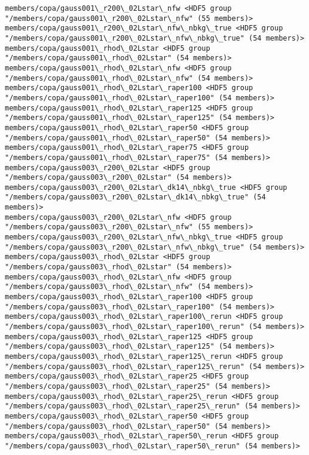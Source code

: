 \documentclass[11pt]{article}
\begin{document}
\begin{Verbatim}[commandchars=\\\{\}]
members/copa/gauss001\_r200\_02Lstar\_nfw <HDF5 group "/members/copa/gauss001\_r200\_02Lstar\_nfw" (55 members)>
members/copa/gauss001\_r200\_02Lstar\_nfw\_nbkg\_true <HDF5 group "/members/copa/gauss001\_r200\_02Lstar\_nfw\_nbkg\_true" (54 members)>
members/copa/gauss001\_rhod\_02Lstar <HDF5 group "/members/copa/gauss001\_rhod\_02Lstar" (54 members)>
members/copa/gauss001\_rhod\_02Lstar\_nfw <HDF5 group "/members/copa/gauss001\_rhod\_02Lstar\_nfw" (54 members)>
members/copa/gauss001\_rhod\_02Lstar\_raper100 <HDF5 group "/members/copa/gauss001\_rhod\_02Lstar\_raper100" (54 members)>
members/copa/gauss001\_rhod\_02Lstar\_raper125 <HDF5 group "/members/copa/gauss001\_rhod\_02Lstar\_raper125" (54 members)>
members/copa/gauss001\_rhod\_02Lstar\_raper50 <HDF5 group "/members/copa/gauss001\_rhod\_02Lstar\_raper50" (54 members)>
members/copa/gauss001\_rhod\_02Lstar\_raper75 <HDF5 group "/members/copa/gauss001\_rhod\_02Lstar\_raper75" (54 members)>
members/copa/gauss003\_r200\_02Lstar <HDF5 group "/members/copa/gauss003\_r200\_02Lstar" (54 members)>
members/copa/gauss003\_r200\_02Lstar\_dk14\_nbkg\_true <HDF5 group "/members/copa/gauss003\_r200\_02Lstar\_dk14\_nbkg\_true" (54 members)>
members/copa/gauss003\_r200\_02Lstar\_nfw <HDF5 group "/members/copa/gauss003\_r200\_02Lstar\_nfw" (55 members)>
members/copa/gauss003\_r200\_02Lstar\_nfw\_nbkg\_true <HDF5 group "/members/copa/gauss003\_r200\_02Lstar\_nfw\_nbkg\_true" (54 members)>
members/copa/gauss003\_rhod\_02Lstar <HDF5 group "/members/copa/gauss003\_rhod\_02Lstar" (54 members)>
members/copa/gauss003\_rhod\_02Lstar\_nfw <HDF5 group "/members/copa/gauss003\_rhod\_02Lstar\_nfw" (54 members)>
members/copa/gauss003\_rhod\_02Lstar\_raper100 <HDF5 group "/members/copa/gauss003\_rhod\_02Lstar\_raper100" (54 members)>
members/copa/gauss003\_rhod\_02Lstar\_raper100\_rerun <HDF5 group "/members/copa/gauss003\_rhod\_02Lstar\_raper100\_rerun" (54 members)>
members/copa/gauss003\_rhod\_02Lstar\_raper125 <HDF5 group "/members/copa/gauss003\_rhod\_02Lstar\_raper125" (54 members)>
members/copa/gauss003\_rhod\_02Lstar\_raper125\_rerun <HDF5 group "/members/copa/gauss003\_rhod\_02Lstar\_raper125\_rerun" (54 members)>
members/copa/gauss003\_rhod\_02Lstar\_raper25 <HDF5 group "/members/copa/gauss003\_rhod\_02Lstar\_raper25" (54 members)>
members/copa/gauss003\_rhod\_02Lstar\_raper25\_rerun <HDF5 group "/members/copa/gauss003\_rhod\_02Lstar\_raper25\_rerun" (54 members)>
members/copa/gauss003\_rhod\_02Lstar\_raper50 <HDF5 group "/members/copa/gauss003\_rhod\_02Lstar\_raper50" (54 members)>
members/copa/gauss003\_rhod\_02Lstar\_raper50\_rerun <HDF5 group "/members/copa/gauss003\_rhod\_02Lstar\_raper50\_rerun" (54 members)>

\end{Verbatim}
\end{document}
